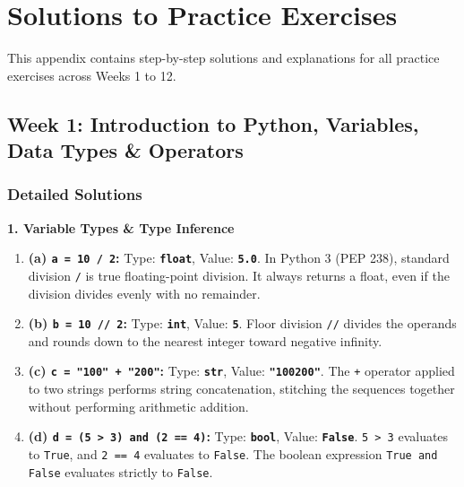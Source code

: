 \appendix
\chapter{Solutions to Practice Exercises}

This appendix contains step-by-step solutions and explanations for all practice exercises across Weeks 1 to 12.

\section*{Week 1: Introduction to Python, Variables, Data Types \& Operators}

\subsection*{Detailed Solutions}

\textbf{1. Variable Types \& Type Inference}
\begin{enumerate}
    \item \textbf{(a) \texttt{a = 10 / 2}:}
    Type: \textbf{\texttt{float}}, Value: \textbf{\texttt{5.0}}.
    In Python 3 (PEP 238), standard division \texttt{/} is true floating-point division. It always returns a float, even if the division divides evenly with no remainder.
    \item \textbf{(b) \texttt{b = 10 // 2}:}
    Type: \textbf{\texttt{int}}, Value: \textbf{\texttt{5}}.
    Floor division \texttt{//} divides the operands and rounds down to the nearest integer toward negative infinity.
    \item \textbf{(c) \texttt{c = "100" + "200"}:}
    Type: \textbf{\texttt{str}}, Value: \textbf{\texttt{"100200"}}.
    The \texttt{+} operator applied to two strings performs string concatenation, stitching the sequences together without performing arithmetic addition.
    \item \textbf{(d) \texttt{d = (5 > 3) and (2 == 4)}:}
    Type: \textbf{\texttt{bool}}, Value: \textbf{\texttt{False}}.
    \texttt{5 > 3} evaluates to \texttt{True}, and \texttt{2 == 4} evaluates to \texttt{False}. The boolean expression \texttt{True and False} evaluates strictly to \texttt{False}.
\end{enumerate}

